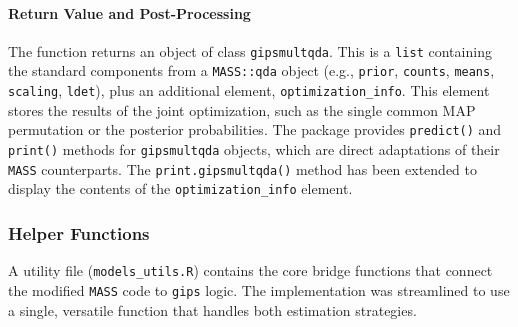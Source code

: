 \documentclass[a4paper,11pt,twoside]{report}
\theoremstyle{definition}
\begin{document}
\paragraph{Return Value and Post-Processing}
The function returns an object of class \texttt{gipsmultqda}. This is a \texttt{list} containing the standard components from a \texttt{MASS::qda} object (e.g., \texttt{prior}, \texttt{counts}, \texttt{means}, \texttt{scaling}, \texttt{ldet}), plus an additional element, \texttt{optimization\_info}. This element stores the results of the joint optimization, such as the single common MAP permutation or the posterior probabilities. The package provides \texttt{predict()} and \texttt{print()} methods for \texttt{gipsmultqda} objects, which are direct adaptations of their \texttt{MASS} counterparts. The \texttt{print.gipsmultqda()} method has been extended to display the contents of the \texttt{optimization\_info} element.

\subsubsection{Helper Functions}
A utility file (\texttt{models\_utils.R}) contains the core bridge functions that connect the modified \texttt{MASS} code to \texttt{gips} logic. The implementation was streamlined to use a single, versatile function that handles both estimation strategies.
\end{document}
